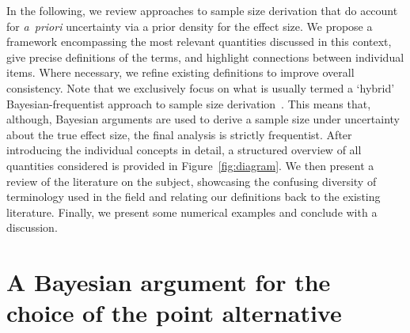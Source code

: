 \documentclass{article}
\begin{document}
In the following, we review approaches to sample size derivation that do account for \textit{a~priori} uncertainty via a prior density for the effect size.
We propose a framework encompassing the most relevant
quantities discussed in this context, give precise definitions of the terms, and highlight connections between individual items.
Where necessary, we refine existing definitions to improve overall consistency.
Note that we exclusively focus on what is usually termed
a `hybrid' Bayesian-frequentist approach
to sample size derivation~\citep{spiegelhalter-2004}.
This means that, although, Bayesian arguments are used to derive
a sample size under uncertainty about the true effect size,
the final analysis is strictly frequentist.
After introducing the individual concepts in detail,
a structured overview of all quantities considered is provided in Figure~\ref{fig:diagram}.
We then present a review of the literature on the subject, showcasing the confusing diversity of terminology used in the field and relating our definitions back to the existing literature.
Finally, we present some numerical examples and conclude with a discussion.



\section{A Bayesian argument for the choice of the point alternative}
\label{sec:quantile-approach}

\newcommand{\rpr}{\operatorname{RPR}}
\end{document}
